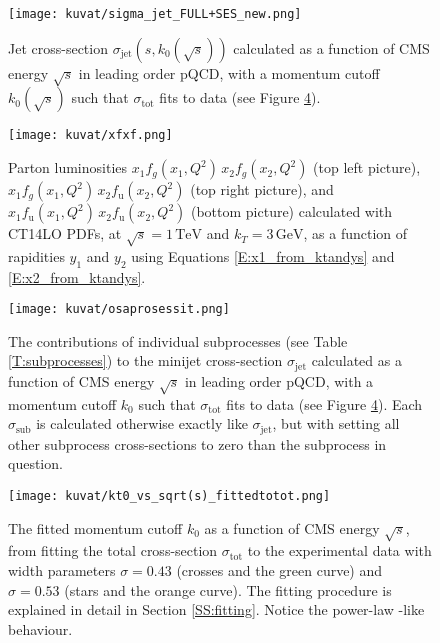 \documentclass[a4paper, twoside, english, 12pt]{report}
\begin{document}
\begin{figure}[htb!]
	\centering
	\texttt{[image: kuvat/sigma\_jet\_FULL+SES\_new.png]}
	\caption{Jet cross-section $\sigma_{\text{jet}}(s, k_0(\sqrt{s}))$ calculated as a function of CMS energy $\sqrt{s}$ in leading order pQCD, with a momentum cutoff $k_0(\sqrt{s})$ such that $\sigma_{\text{tot}}$ fits to data (see Figure \ref{F:kt0_fitting}).}
	\label{F:FULL_vs_SES}
\end{figure}

\begin{figure}[htb!]
	\centering
	\texttt{[image: kuvat/xfxf.png]}
	\caption{Parton luminosities $x_1f_g(x_1,Q^2)\,x_2f_g(x_2,Q^2)$ (top left picture), $x_1f_g(x_1,Q^2)\,x_2f_{\text{u}}(x_2,Q^2)$ (top right picture), and $x_1f_{\text{u}}(x_1,Q^2)\,x_2f_{\text{u}}(x_2,Q^2)$ (bottom picture) calculated with CT14LO \cite{ct14lo} PDFs, at $\sqrt{s}=1\,\text{TeV}$ and $k_T=3\,\text{GeV}$, as a function of rapidities $y_1$ and $y_2$ using Equations \eqref{E:x1_from_ktandys} and \eqref{E:x2_from_ktandys}.}
	\label{F:xfxf}
\end{figure}

\begin{figure}[htb!]
	\centering
	\texttt{[image: kuvat/osaprosessit.png]}
	\caption{The contributions of individual subprocesses (see Table \ref{T:subprocesses}) to the minijet cross-section $\sigma_{\text{jet}}$ calculated as a function of CMS energy $\sqrt{s}$ in leading order pQCD, with a momentum cutoff $k_0$ such that $\sigma_{\text{tot}}$ fits to data (see Figure \ref{F:kt0_fitting}). Each $\sigma_{\text{sub}}$ is calculated otherwise exactly like $\sigma_{\text{jet}}$, but with setting all other subprocess cross-sections to zero than the subprocess in question.}
	\label{F:subprocess_contribution}
\end{figure}

\begin{figure}[htb!]
	\centering
	\texttt{[image: kuvat/kt0\_vs\_sqrt(s)\_fittedtotot.png]}
	\caption{The fitted momentum cutoff $k_0$ as a function of CMS energy $\sqrt{s}$, from fitting the total cross-section $\sigma_{\text{tot}}$ to the experimental data with width parameters $\sigma=0.43$ (crosses and the green curve) and $\sigma=0.53$ (stars and the orange curve). The fitting procedure is explained in detail in Section \ref{SS:fitting}. Notice the power-law -like behaviour.}
	\label{F:kt0_fitting}
\end{figure}
\end{document}
